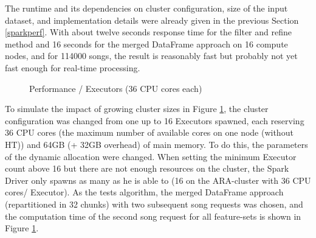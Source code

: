 The runtime and its dependencies on cluster configuration, size of the input dataset, and implementation details were already given in the previous Section \ref{sparkperf}. With about twelve seconds response time for the filter and refine method and 16 seconds for the merged DataFrame approach on 16 compute nodes, and for 114000 songs, the result is reasonably fast but probably not yet fast enough for real-time processing.\\ 

\FloatBarrier
\begin{figure}[htbp]
   	\centering
   	\caption{Performance / Executors (36 CPU cores each)}
   	\label{perfspark6}
\end{figure}
\FloatBarrier

\noindent To simulate the impact of growing cluster sizes in Figure \ref{perfspark6}, the cluster configuration was changed from one up to 16 Executors spawned, each reserving 36 CPU cores (the maximum number of available cores on one node (without HT)) and 64GB (+ 32GB overhead) of main memory. To do this, the parameters of the dynamic allocation were changed. When setting the minimum Executor count above 16 but there are not enough resources on the cluster, the Spark Driver only spawns as many as he is able to (16 on the ARA-cluster with 36 CPU cores/ Executor). As the tests algorithm, the merged DataFrame approach (repartitioned in 32 chunks) with two subsequent song requests was chosen, and the computation time of the second song request for all feature-sets is shown in Figure \ref{perfspark6}.\\

